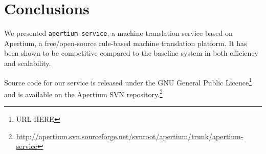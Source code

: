 \documentclass[11pt]{article}
\begin{document}
%
%
%
%
%



\section{Conclusions}

We presented {\tt\small apertium-service}, a machine translation service based on Apertium, a 
free/open-source rule-based machine translation platform. It has been shown to be competitive
compared to the baseline system in both efficiency and scalability.

Source code for our service is released under the GNU General Public Licence\footnote{URL HERE} 
and is available on the Apertium SVN repository.\footnote{{\small \url{http://apertium.svn.sourceforge.net/svnroot/apertium/trunk/apertium-service}}}
\end{document}
